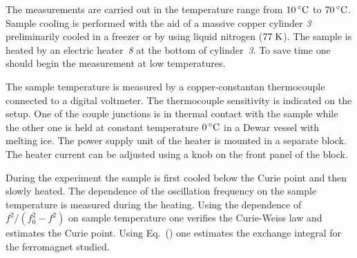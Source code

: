 The measurements are carried out in the temperature range from $10\celsii$ to $70\celsii$. Sample cooling is performed with the aid of a massive copper cylinder \emph{3} preliminarily cooled in a freezer or by using liquid nitrogen ($77\;\kelvin$). The sample is heated by an electric heater~\emph{8} at the bottom of cylinder~\emph{3}. To save time one should begin the measurement at low temperatures.

The sample temperature is measured by a copper-constantan thermocouple connected to a digital voltmeter. The thermocouple sensitivity is indicated on the setup. One of the couple junctions is in thermal contact with the sample while the other one is held at constant temperature \mbox{$0\celsii$} in a Dewar vessel with melting ice. The power supply unit of the heater is mounted in a separate block. The heater current can be adjusted using a knob on the front panel of the block.

During the experiment the sample is first cooled below the Curie point and then slowly heated. The dependence of the oscillation frequency on the sample temperature is measured during the heating. Using the dependence of $f^{2}/(f_{0}^{2}-f^{2})$ on sample temperature one verifies the Curie-Weiss law and estimates the Curie point. Using Eq.~() one estimates the exchange integral for the ferromagnet studied. \vspace{1ex}

\textbf{}\vspace{5pt}

